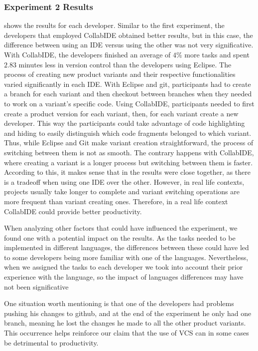 \subsubsection{Experiment 2 Results}

 shows the results for each developer. Similar to the first experiment, 
the developers that employed CollabIDE obtained better results, but in this case, the difference 
between using an IDE versus using the other was not very significative. With CollabIDE, the 
developers finished an average of $4\%$ more tasks and spent 
$2.83$ minutes less in version control than the developers using Eclipse.
 The process of creating new product variants and their 
respective functionalities varied significantly in each IDE. With Eclipse and git, participants had to 
create a branch for each variant and then checkout between branches when they needed to work on a 
variant’s specific code. Using CollabIDE, participants needed to first create a product version for each 
variant, then, for each variant create a new developer. This way the participants could take advantage 
of code highlighting and hiding to easily distinguish which code fragments belonged to which variant. 
Thus, while Eclipse and Git make variant creation straightforward, the process of switching between 
them is not as smooth. The contrary happens with CollabIDE, where creating a variant is a longer 
process but switching between them is faster. According to this, it makes sense that in the results 
were close together, as there is a tradeoff when using one IDE over the other. However, in real life 
contexts, projects usually take longer to complete and variant switching operations are more frequent 
than variant creating ones. Therefore, in a real life context CollabIDE could provide better productivity.

When analyzing other factors that could have influenced the experiment, we found one with a potential 
impact on the results. As the tasks needed to be implemented in different languages, the differences 
between these could have led to some developers being more familiar with one of the languages. 
Nevertheless, when we assigned the tasks to each developer we took into account their prior 
experience with the language, so the impact of languages differences may have not been significative

One situation worth mentioning is that one of the developers had problems pushing his changes to 
github, and at the end of the experiment he only had one branch, meaning he lost the changes he 
made to all the other product variants. This occurrence helps reinforce our claim that the use of 
\ac{VCS} can in some cases be detrimental to productivity.

